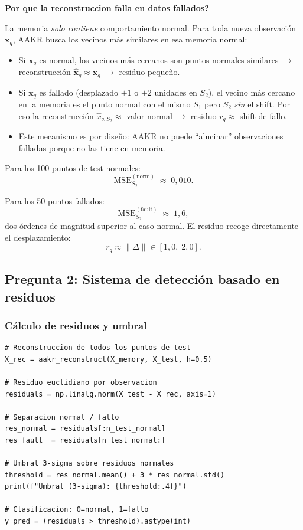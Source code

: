 \documentclass[12pt,a4paper]{article}
\newcommand{\porque}[2]{%
  \vspace{8pt}%
  \begin{mdframed}[backgroundcolor=porqueFondo,
                   linecolor=porqueBorde,
                   linewidth=1.5pt,
                   leftmargin=0pt,
                   rightmargin=0pt,
                   innerleftmargin=10pt,
                   innerrightmargin=10pt,
                   innertopmargin=6pt,
                   innerbottommargin=6pt]
    {\color{porqueBorde}\bfseries\small Por que #1}\\[3pt]
    {\small #2}
  \end{mdframed}%
  \vspace{8pt}%
}
\begin{document}
\porque{la reconstruccion falla en datos fallados?}{%
La memoria \emph{solo contiene} comportamiento normal. Para toda nueva observaci\'on
$\mathbf{x}_q$, AAKR busca los vecinos m\'as similares en esa memoria normal:
\begin{itemize}[leftmargin=1.5em,noitemsep]
  \item Si $\mathbf{x}_q$ es normal, los vecinos m\'as cercanos son puntos normales
        similares $\to$ reconstrucci\'on $\hat{\mathbf{x}}_q \approx \mathbf{x}_q$
        $\to$ residuo peque\~no.
  \item Si $\mathbf{x}_q$ es fallado (desplazado $+1$ o $+2$ unidades en $S_2$),
        el vecino m\'as cercano en la memoria es el punto normal con el mismo $S_1$
        pero $S_2$ \emph{sin} el shift. Por eso la reconstrucci\'on
        $\hat{x}_{q,S_2} \approx$ valor normal $\to$ residuo
        $r_q \approx$ shift de fallo.
  \item Este mecanismo es por dise\~no: AAKR no puede ``alucinar'' observaciones
        falladas porque no las tiene en memoria.
\end{itemize}}

Para los 100 puntos de test normales:
\begin{equation*}
  \text{MSE}_{S_2}^{(\text{norm})} \;\approx\; 0{,}010.
\end{equation*}

Para los 50 puntos fallados:
\begin{equation*}
  \text{MSE}_{S_2}^{(\text{fault})} \;\approx\; 1{,}6,
\end{equation*}
dos \'ordenes de magnitud superior al caso normal. El residuo recoge directamente
el desplazamiento:
\begin{equation*}
  r_q \approx \|\Delta\| \in [1{,}0,\;2{,}0].
\end{equation*}

\subsection{Pregunta 2: Sistema de detecci\'on basado en residuos}

\subsubsection{C\'alculo de residuos y umbral}

\begin{lstlisting}[caption={C\'alculo de residuos y umbral de detecci\'on 3-sigma},
                   label={lst:residuals}]
# Reconstruccion de todos los puntos de test
X_rec = aakr_reconstruct(X_memory, X_test, h=0.5)

# Residuo euclidiano por observacion
residuals = np.linalg.norm(X_test - X_rec, axis=1)

# Separacion normal / fallo
res_normal = residuals[:n_test_normal]
res_fault  = residuals[n_test_normal:]

# Umbral 3-sigma sobre residuos normales
threshold = res_normal.mean() + 3 * res_normal.std()
print(f"Umbral (3-sigma): {threshold:.4f}")

# Clasificacion: 0=normal, 1=fallo
y_pred = (residuals > threshold).astype(int)
\end{lstlisting}
\end{document}
